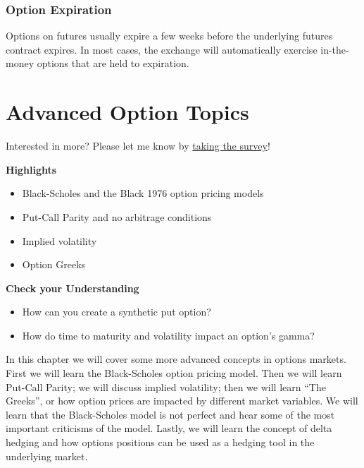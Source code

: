 \documentclass[
  letterpaper,
  DIV=11,
  numbers=noendperiod]{scrreprt}
\begin{document}
\hypertarget{option-expiration}{%
\subsection{Option Expiration}\label{option-expiration}}

Options on futures usually expire a few weeks before the underlying
futures contract expires. In most cases, the exchange will automatically
exercise in-the-money options that are held to expiration.


\hypertarget{advanced-option-topics}{%
\chapter{Advanced Option Topics}\label{advanced-option-topics}}

{Interested in more? Please let me know by}
\href{https://forms.gle/Q3VByCQZHjfQSy9D7}{taking the survey}!

\textbf{Highlights}

\begin{itemize}
\item
  Black-Scholes and the Black 1976 option pricing models
\item
  Put-Call Parity and no arbitrage conditions
\item
  Implied volatility
\item
  Option Greeks
\end{itemize}

\textbf{Check your Understanding}

\begin{itemize}
\item
  How can you create a synthetic put option?
\item
  How do time to maturity and volatility impact an option's gamma?
\end{itemize}

In this chapter we will cover some more advanced concepts in options
markets. First we will learn the Black-Scholes option pricing model.
Then we will learn Put-Call Parity; we will discuss implied volatility;
then we will learn ``The Greeks'', or how option prices are impacted by
different market variables. We will learn that the Black-Scholes model
is not perfect and hear some of the most important criticisms of the
model. Lastly, we will learn the concept of delta hedging and how
options positions can be used as a hedging tool in the underlying
market.
\end{document}
